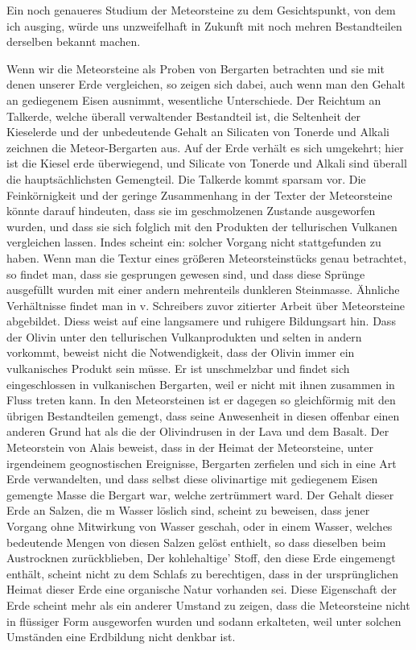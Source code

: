 \documentclass[a4paper, 11pt, oneside]{article}
\begin{document}
Ein noch genaueres Studium der Meteorsteine zu dem Gesichtspunkt, von dem ich ausging, würde uns unzweifelhaft in Zukunft mit noch mehren Bestandteilen derselben bekannt machen.

Wenn wir die Meteorsteine als Proben von Bergarten betrachten und sie mit denen unserer Erde vergleichen, so zeigen sich dabei, auch wenn man den Gehalt an gediegenem Eisen ausnimmt, wesentliche Unterschiede. Der Reichtum an Talkerde, welche überall verwaltender Bestandteil ist, die Seltenheit der Kieselerde und der unbedeutende Gehalt an Silicaten von Tonerde und Alkali zeichnen die Meteor-Bergarten aus. Auf der Erde verhält es sich umgekehrt; hier ist die Kiesel erde überwiegend, und Silicate von Tonerde und Alkali sind überall die hauptsächlichsten Gemengteil. Die Talkerde kommt sparsam vor. Die Feinkörnigkeit und der geringe Zusammenhang in der Texter der Meteorsteine könnte darauf hindeuten, dass sie im geschmolzenen Zustande ausgeworfen wurden, und dass sie sich folglich mit den Produkten der tellurischen Vulkanen vergleichen lassen. Indes scheint ein: solcher Vorgang nicht stattgefunden zu haben. Wenn man die Textur eines größeren Meteorsteinstücks genau betrachtet, so findet man, dass sie gesprungen gewesen sind, und dass diese Sprünge ausgefüllt wurden mit einer andern mehrenteils dunkleren Steinmasse. Ähnliche Verhältnisse findet man in v. Schreibers zuvor zitierter Arbeit über Meteorsteine abgebildet. Diess weist auf eine langsamere und ruhigere Bildungsart hin. Dass der Olivin unter den tellurischen Vulkanprodukten und selten in andern vorkommt, beweist nicht die Notwendigkeit, dass der Olivin immer ein vulkanisches Produkt sein müsse. Er ist unschmelzbar und findet sich eingeschlossen in vulkanischen Bergarten, weil er nicht mit ihnen zusammen in Fluss treten kann. In den Meteorsteinen ist er dagegen so gleichförmig mit den übrigen Bestandteilen gemengt, dass seine Anwesenheit in diesen offenbar einen anderen Grund hat als die der Olivindrusen in der Lava und dem Basalt. Der Meteorstein von Alais beweist, dass in der Heimat der Meteorsteine, unter irgendeinem geognostischen Ereignisse, Bergarten zerfielen und sich in eine Art Erde verwandelten, und dass selbst diese olivinartige mit gediegenem Eisen gemengte Masse die Bergart war, welche zertrümmert ward. Der Gehalt dieser Erde an Salzen, die m Wasser löslich sind, scheint zu beweisen, dass jener Vorgang ohne Mitwirkung von Wasser geschah, oder in einem Wasser, welches bedeutende Mengen von diesen Salzen gelöst enthielt, so dass dieselben beim Austrocknen zurückblieben, Der kohlehaltige' Stoff, den diese Erde eingemengt enthält, scheint nicht zu dem Schlafs zu berechtigen, dass in der ursprünglichen Heimat dieser Erde eine organische Natur vorhanden sei. Diese Eigenschaft der Erde scheint mehr als ein anderer Umstand zu zeigen, dass die Meteorsteine nicht in flüssiger Form ausgeworfen wurden und sodann erkalteten, weil unter solchen Umständen eine Erdbildung nicht denkbar ist.
\end{document}
